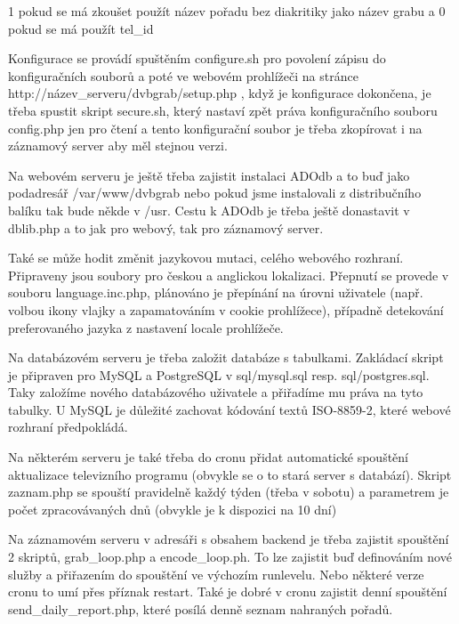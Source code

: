 1 pokud se má zkoušet použít název pořadu bez diakritiky jako název grabu a 0 pokud se má použít tel\_id

Konfigurace se provádí spuštěním configure.sh pro povolení zápisu do konfiguračních souborů a poté ve webovém prohlížeči na stránce http://název\_serveru/dvbgrab/setup.php , když je konfigurace dokončena, je třeba spustit skript secure.sh, který nastaví zpět práva konfiguračního souboru config.php jen pro čtení a tento konfigurační soubor je třeba zkopírovat i na záznamový server aby měl stejnou verzi.

\vspace{10pt}

Na webovém serveru je ještě třeba zajistit instalaci ADOdb a to buď jako podadresář /var/www/dvbgrab nebo pokud jsme instalovali z distribučního balíku tak bude někde v /usr. Cestu k ADOdb je třeba ještě donastavit v dblib.php a to jak pro webový, tak pro záznamový server.

\vspace{10pt}

Také se může hodit změnit jazykovou mutaci, celého webového rozhraní. Připraveny jsou soubory pro českou a anglickou lokalizaci. Přepnutí se provede v souboru language.inc.php, plánováno je přepínání na úrovni uživatele (např. volbou ikony vlajky a zapamatováním v cookie prohlížece), případně detekování preferovaného jazyka z nastavení locale prohlížeče.

\vspace{10pt}

Na databázovém serveru je třeba založit databáze s tabulkami. Zakládací skript je připraven pro MySQL a PostgreSQL v sql/mysql.sql resp. sql/postgres.sql. Taky založíme nového databázového uživatele a přiřadíme mu práva na tyto tabulky. U MySQL je důležité zachovat kódování textů ISO-8859-2, které webové rozhraní předpokládá.

\vspace{10pt}

Na některém serveru je také třeba do cronu přidat automatické spouštění aktualizace televizního programu (obvykle se o to stará server s databází). Skript zaznam.php se spouští pravidelně každý týden (třeba v sobotu) a parametrem je počet zpracovávaných dnů (obvykle je k dispozici na 10 dní) 

\vspace{10pt}

Na záznamovém serveru v adresáři s obsahem backend je třeba zajistit spouštění 2 skriptů, grab\_loop.php a encode\_loop.ph. To lze zajistit buď definováním nové služby a přiřazením do spouštění ve výchozím runlevelu. Nebo některé verze cronu to umí přes příznak restart. Také je dobré v cronu zajistit denní spouštění send\_daily\_report.php, které posílá denně seznam nahraných pořadů.

